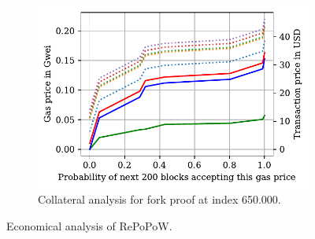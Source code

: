 \begin{figure}[h]
\begin{subfigure}{0.97\linewidth}
    \begin{center}
        \includegraphics[width=1\columnwidth]{figures/cryptoeconomics-650K.pdf}
    \end{center}
    \caption{Collateral analysis for fork proof at index 650.000.}
    \label{fig:cryptoeconomics-650K}
\end{subfigure}
\caption{Economical analysis of RePoPoW.}
\label{fig:cryptoeconomics}
\end{figure}


